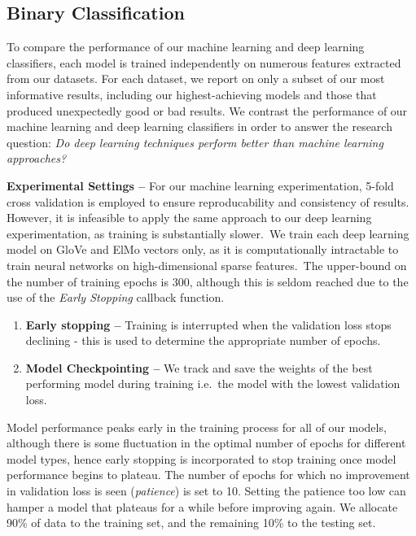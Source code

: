 \documentclass[12pt,a4paper]{article}
\begin{document}
\subsection{Binary Classification}\vspace{-5pt}
\noindent To compare the performance of our machine learning and deep learning classifiers, each model is trained independently on numerous features extracted from our datasets. For each dataset, we report on only a subset of our most informative results, including our highest-achieving models and those that produced unexpectedly good or bad results. We contrast the performance of our machine learning and deep learning classifiers in order to answer the research question: \textit{Do deep learning techniques perform better than machine learning approaches?}\\\vspace{-5pt}



\noindent \textbf{Experimental Settings --} For our machine learning experimentation, 5-fold cross validation is employed to ensure reproducability and consistency of results. However, it is infeasible to apply the same approach to our deep learning experimentation, as training is substantially slower.\ We train each deep learning model on GloVe and ElMo vectors only, as it is computationally intractable to train neural networks on high-dimensional sparse features.\ The upper-bound on the number of training epochs is 300, although this is seldom reached due to the use of the \textit{Early Stopping} callback function. \vspace{-4pt}

\begin{enumerate}
	\item \textbf{Early stopping --} Training is interrupted when the validation loss stops declining - this is used to determine the appropriate number of epochs.\vspace{-8pt}
	\item \textbf{Model Checkpointing --} We track and save the weights of the best performing model during training i.e.\ the model with the lowest validation loss.
\end{enumerate}\vspace{-4pt}

\noindent Model performance peaks early in the training process for all of our models, although there is some fluctuation in the optimal number of epochs for different model types, hence early stopping is incorporated to stop training once model performance begins to plateau. The number of epochs for which no improvement in validation loss is seen (\textit{patience}) is set to 10. Setting the patience too low can hamper a model that plateaus for a while before improving again. We allocate 90\% of data to the training set, and the remaining 10\% to the testing set.
\end{document}
